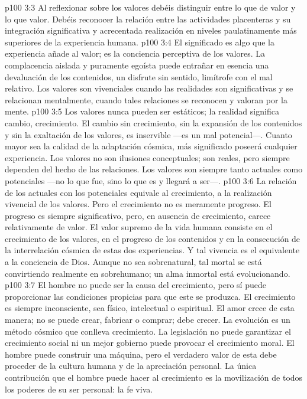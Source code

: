 \vs p100 3:3 Al reflexionar sobre los valores debéis distinguir entre lo que  de valor y lo que  valor. Debéis reconocer la relación entre las actividades placenteras y su integración significativa y acrecentada realización en niveles paulatinamente más superiores de la experiencia humana.
\vs p100 3:4 \pc El significado es algo que la experiencia añade al valor; es la conciencia perceptiva de los valores. La complacencia aislada y puramente egoísta puede entrañar en esencia una devaluación de los contenidos, un disfrute sin sentido, limítrofe con el mal relativo. Los valores son vivenciales cuando las realidades son significativas y se relacionan mentalmente, cuando tales relaciones se reconocen y valoran por la mente.
\vs p100 3:5 \pc Los valores nunca pueden ser estáticos; la realidad significa cambio, crecimiento. El cambio sin crecimiento, sin la expansión de los contenidos y sin la exaltación de los valores, es inservible ---es un mal potencial---. Cuanto mayor sea la calidad de la adaptación cósmica, más significado poseerá cualquier experiencia. Los valores no son ilusiones conceptuales; son reales, pero siempre dependen del hecho de las relaciones. Los valores son siempre tanto actuales como potenciales ---no lo que fue, sino lo que es y llegará a ser---.
\vs p100 3:6 La relación de los actuales con los potenciales equivale al crecimiento, a la realización vivencial de los valores. Pero el crecimiento no es meramente progreso. El progreso es siempre significativo, pero, en ausencia de crecimiento, carece relativamente de valor. El valor supremo de la vida humana consiste en el crecimiento de los valores, en el progreso de los contenidos y en la consecución de la interrelación cósmica de estas dos experiencias. Y tal vivencia es el equivalente a la conciencia de Dios. Aunque no sea sobrenatural, tal mortal se está convirtiendo realmente en sobrehumano; un alma inmortal está evolucionando.
\vs p100 3:7 El hombre no puede ser la causa del crecimiento, pero sí puede proporcionar las condiciones propicias para que este se produzca. El crecimiento es siempre inconsciente, sea físico, intelectual o espiritual. El amor crece de esta manera; no se puede crear, fabricar o comprar; debe crecer. La evolución es un método cósmico que conlleva crecimiento. La legislación no puede garantizar el crecimiento social ni un mejor gobierno puede provocar el crecimiento moral. El hombre puede construir una máquina, pero el verdadero valor de esta debe proceder de la cultura humana y de la apreciación personal. La única contribución que el hombre puede hacer al crecimiento es la movilización de todos los poderes de su ser personal: la fe viva.
